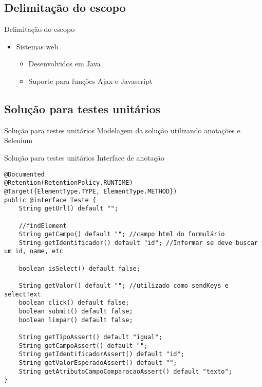 \documentclass{beamer}
\begin{document}
\subsection{Delimitação do escopo}
\begin{frame}{Delimitação do escopo}
	\begin{itemize}
		\item Sistemas web
		\begin{itemize}
			\item Desenvolvidos em Java
			\item Suporte para funções Ajax e Javascript
		\end{itemize}
	\end{itemize}
\end{frame}
\subsection{Solução para testes unitários}
\begin{frame}{Solução para testes unitários}
    Modelagem da solução utilizando anotações e Selenium
	\begin{center}\end{center}
\end{frame}
\begin{frame}[fragile]{Solução para testes unitários}
    Interface de anotação
    \begin{lstlisting}
@Documented
@Retention(RetentionPolicy.RUNTIME)
@Target({ElementType.TYPE, ElementType.METHOD})
public @interface Teste {
    String getUrl() default "";

    //findElement
    String getCampo() default ""; //campo html do formulário
    String getIdentificador() default "id"; //Informar se deve buscar um id, name, etc

    boolean isSelect() default false;

    String getValor() default ""; //utilizado como sendKeys e selectText
    boolean click() default false;
    boolean submit() default false;
    boolean limpar() default false;

    String getTipoAssert() default "igual";
    String getCampoAssert() default "";
    String getIdentificadorAssert() default "id";
    String getValorEsperadoAssert() default "";
    String getAtributoCampoComparacaoAssert() default "texto";
}
	\end{lstlisting}
\end{frame}
\end{document}
